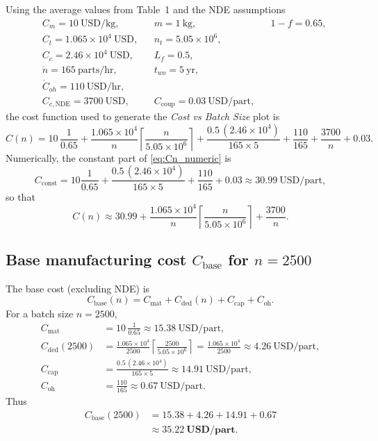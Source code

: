 \documentclass[11pt]{article}
\begin{document}
Using the average values from Table~1 and the NDE assumptions
\[
\begin{aligned}
  &C_m = 10~\text{USD/kg},  &&m = 1~\text{kg}, &&1-f = 0.65,\\
  &C_t = 1.065\times10^{4}~\text{USD}, &&n_t = 5.05\times10^{6},\\
  &C_c = 2.46\times10^{4}~\text{USD}, &&L_f = 0.5,\\
  &\dot{n} = 165~\text{parts/hr}, &&t_{wo} = 5~\text{yr},\\
  &\dot{C}_{oh}=110~\text{USD/hr},\\
  &C_{c,\text{NDE}} = 3700~\text{USD}, &&C_{\text{coup}} = 0.03~\text{USD/part},
\end{aligned}
\]
the cost function used to generate the \emph{Cost vs Batch Size} plot is
\begin{equation}
  C(n)
  = 10\,\frac{1}{0.65}
    + \frac{1.065\times10^{4}}{n}
      \left\lceil \frac{n}{5.05\times10^{6}} \right\rceil
    + \frac{0.5\,(2.46\times10^{4})}{165\times 5}
    + \frac{110}{165}
    + \frac{3700}{n}
    + 0.03.
  \label{eq:Cn_numeric}
\end{equation}
Numerically, the constant part of \eqref{eq:Cn_numeric} is
\[
C_{\text{const}}
  = 10\frac{1}{0.65}
  + \frac{0.5\,(2.46\times10^{4})}{165\times 5}
  + \frac{110}{165}
  + 0.03
  \approx 30.99~\text{USD/part},
\]
so that
\[
C(n) \approx 30.99
       + \frac{1.065\times10^{4}}{n}
         \left\lceil \frac{n}{5.05\times10^{6}} \right\rceil
       + \frac{3700}{n}.
\]

\subsection*{Base manufacturing cost \(C_{\text{base}}\) for \(n=2500\)}

The base cost (excluding NDE) is
\begin{equation}
  C_{\text{base}}(n)
  = C_{\text{mat}} + C_{\text{ded}}(n) + C_{\text{cap}} + C_{\text{oh}}.
\end{equation}
For a batch size \(n = 2500\),
\begin{align}
  C_{\text{mat}}
    &= 10\,\frac{1}{0.65}
     \approx 15.38~\text{USD/part}, \\[2pt]
  C_{\text{ded}}(2500)
    &= \frac{1.065\times10^{4}}{2500}
       \left\lceil \frac{2500}{5.05\times10^{6}} \right\rceil
     = \frac{1.065\times10^{4}}{2500}
     \approx 4.26~\text{USD/part}, \\[2pt]
  C_{\text{cap}}
    &= \frac{0.5\,(2.46\times10^{4})}{165\times 5}
     \approx 14.91~\text{USD/part}, \\[2pt]
  C_{\text{oh}}
    &= \frac{110}{165}
     \approx 0.67~\text{USD/part}.
\end{align}
Thus
\begin{align}
  C_{\text{base}}(2500)
    &= 15.38 + 4.26 + 14.91 + 0.67 \\
    &\approx \mathbf{35.22~\text{USD/part}}.
\end{align}
\end{document}
